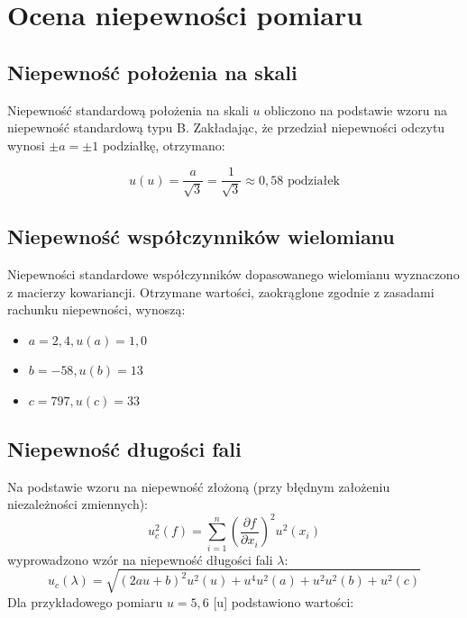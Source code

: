 \documentclass[a4paper,12pt]{article}
\begin{document}
\section{Ocena niepewności pomiaru}

\subsection{Niepewność położenia na skali}

Niepewność standardową położenia na skali $u$ obliczono na podstawie wzoru na niepewność standardową typu B. Zakładając, że przedział niepewności odczytu wynosi $\pm a = \pm 1$ podziałkę, otrzymano:

\begin{equation*}
    u(u) = \frac{a}{\sqrt{3}} = \frac{1}{\sqrt{3}} \approx 0{,}58 \text{ podziałek}
\end{equation*}


\subsection{Niepewność współczynników wielomianu}

Niepewności standardowe współczynników dopasowanego wielomianu wyznaczono z macierzy kowariancji. Otrzymane wartości, zaokrąglone zgodnie z zasadami rachunku niepewności, wynoszą:

\begin{itemize}
    \item $a = 2{,}4, u(a) = 1{,}0$
    \item $b = -58, u(b) = 13$
    \item $c = 797, u(c) = 33$
\end{itemize}

\subsection{Niepewność długości fali}


Na podstawie wzoru na niepewność złożoną (przy błędnym założeniu niezależności zmiennych):
$$
    u_c^2(f) = \sum_{i=1}^{n} \left(\frac{\partial f}{\partial x_i}\right)^2 u^2(x_i)
$$
wyprowadzono wzór na niepewność długości fali $\lambda$:
$$
    u_c(\lambda) = \sqrt{ (2au + b)^2 u^2(u) + u^4 u^2(a) + u^2 u^2(b) + u^2(c) }
$$
Dla przykładowego pomiaru $u = 5{,}6$ [u] podstawiono wartości:
\end{document}
